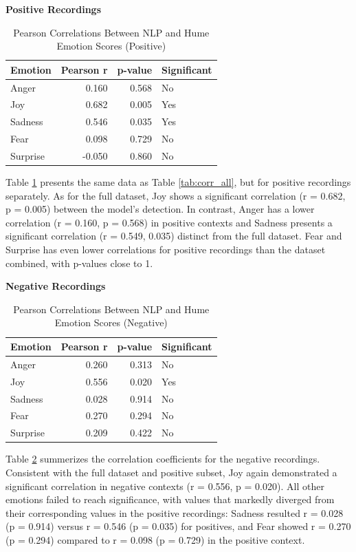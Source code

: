 \begin{table}[H]
    \centering
    \caption*{\textbf{Positive Recordings}}
    \begin{tabular}{lrrl}
      \toprule
      \textbf{Emotion} & \textbf{Pearson r} & \textbf{p-value} & \textbf{Significant}\\
      \midrule
      Anger    & 0.160  & 0.568 & No  \\
      Joy      & 0.682  & 0.005 & Yes \\
      Sadness  & 0.546  & 0.035 & Yes \\
      Fear     & 0.098  & 0.729 & No  \\
      Surprise & -0.050 & 0.860 & No  \\
      \bottomrule
    \end{tabular}
    \caption{Pearson Correlations Between NLP and Hume Emotion Scores (Positive)}
    \label{tab:corr_pos}
  \end{table}
Table \ref{tab:corr_pos} presents the same data as Table \ref{tab:corr_all}, but for positive recordings separately. As for the full dataset, Joy shows a significant correlation (r = 0.682, p = 0.005) between the model’s detection. In contrast, Anger has a lower correlation (r = 0.160, p = 0.568) in positive contexts and Sadness presents a significant correlation (r = 0.549, 0.035) distinct from the full dataset. Fear and Surprise has even lower correlations for positive recordings than the dataset combined, with p-values close to 1. 

\begin{table}[H]
    \centering
    \caption*{\textbf{Negative Recordings}}
    \begin{tabular}{lrrl}
      \toprule
      \textbf{Emotion} & \textbf{Pearson r} & \textbf{p-value} & \textbf{Significant}\\
      \midrule
      Anger    & 0.260 & 0.313 & No  \\
      Joy      & 0.556 & 0.020 & Yes \\
      Sadness  & 0.028 & 0.914 & No  \\
      Fear     & 0.270 & 0.294 & No  \\
      Surprise & 0.209 & 0.422 & No  \\
      \bottomrule
    \end{tabular}
    \caption{Pearson Correlations Between NLP and Hume Emotion Scores (Negative)}
    \label{tab:corr_neg}
  \end{table}
  Table \ref{tab:corr_neg} summerizes the correlation coefficients for the negative recordings. Consistent with the full dataset and positive subset, Joy again demonstrated  a significant correlation in negative contexts (r = 0.556, p = 0.020). 
  All other emotions failed to reach significance, with values that markedly diverged from their corresponding values in the positive recordings: 
  Sadness resulted r = 0.028 (p = 0.914) versus r = 0.546 (p = 0.035) for positives, and Fear showed r = 0.270 (p = 0.294) compared to r = 0.098 (p = 0.729) in the positive context. 



